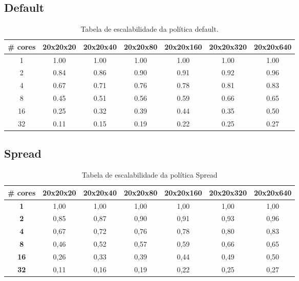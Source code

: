 \documentclass[a4paper, 12pt]{article}
\begin{document}
	\subsection{Default}	
	\begin{table}[h]
		\centering
		\begin{tabular}{|c|c|c|c|c|c|c|}
			\hline
			\textbf{\# cores }& \textbf{20x20x20} & \textbf{20x20x40} & \textbf{20x20x80} & \textbf{20x20x160} & \textbf{20x20x320} & \textbf{20x20x640} \\ \hline
			1        & 1.00     & 1.00     & 1.00     & 1.00      & 1.00      & 1.00      \\ \hline
			2        & 0.84     & 0.86     & 0.90     & 0.91      & 0.92      & 0.96      \\ \hline
			4        & 0.67     & 0.71     & 0.76     & 0.78      & 0.81      & 0.83      \\ \hline
			8        & 0.45     & 0.51     & 0.56     & 0.59      & 0.66      & 0.65      \\ \hline
			16       & 0.25     & 0.32     & 0.39     & 0.44      & 0.35      & 0.50      \\ \hline
			32       & 0.11     & 0.15     & 0.19     & 0.22      & 0.25      & 0.27      \\ \hline
		\end{tabular}
		\caption{Tabela de escalabilidade da política default.}
	\end{table}
	
	\subsection{Spread}
	\begin{table}[htbp]
		\centering
		\begin{tabular}{|c|c|c|c|c|c|c|}
			\hline
			\textbf{\# cores} & \textbf{20x20x20} & \textbf{20x20x40} & \textbf{20x20x80} & \textbf{20x20x160} & \textbf{20x20x320} & \textbf{20x20x640} \\
			\hline
			\textbf{1} & 1,00 & 1,00 & 1,00 & 1,00 & 1,00 & 1,00 \\
			\hline
			\textbf{2} & 0,85 & 0,87 & 0,90 & 0,91 & 0,93 & 0,96 \\
			\hline
			\textbf{4} & 0,67 & 0,72 & 0,76 & 0,78 & 0,80 & 0,83 \\
			\hline
			\textbf{8} & 0,46 & 0,52 & 0,57 & 0,59 & 0,66 & 0,65 \\
			\hline
			\textbf{16} & 0,26 & 0,33 & 0,39 & 0,44 & 0,49 & 0,50 \\
			\hline
			\textbf{32} & 0,11 & 0,16 & 0,19 & 0,22 & 0,25 & 0,27 \\
			\hline
		\end{tabular}
		\caption{Tabela de escalabilidade da política Spread}
	\end{table}
	
\end{document}
